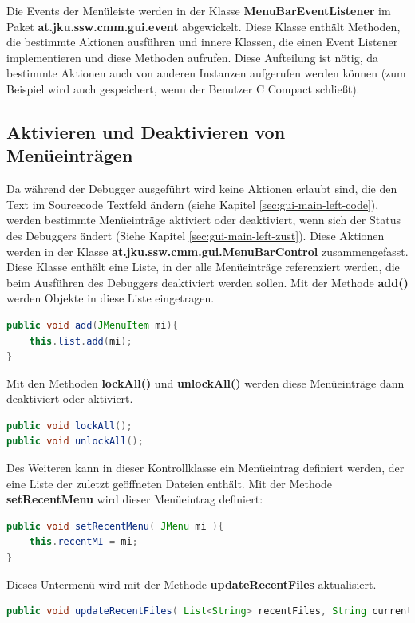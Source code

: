 Die Events der Menüleiste werden in der Klasse \textbf{MenuBarEventListener} im Paket \textbf{at.jku.ssw.cmm.gui.event} abgewickelt. Diese Klasse enthält Methoden, die bestimmte Aktionen ausführen und innere Klassen, die einen Event Listener implementieren und diese Methoden aufrufen. Diese Aufteilung ist nötig, da bestimmte Aktionen auch von anderen Instanzen aufgerufen werden können (zum Beispiel wird auch gespeichert, wenn der Benutzer C Compact schließt).

\subsection{Aktivieren und Deaktivieren von Menüeinträgen}
\label{sec:gui-main-menu-ctrl}
Da während der Debugger ausgeführt wird keine Aktionen erlaubt sind, die den Text im Sourcecode Textfeld ändern (siehe Kapitel \ref{sec:gui-main-left-code}), werden bestimmte Menüeinträge aktiviert oder deaktiviert, wenn sich der Status des Debuggers ändert (Siehe Kapitel \ref{sec:gui-main-left-zust}). Diese Aktionen werden in der Klasse \textbf{at.jku.ssw.cmm.gui.MenuBarControl} zusammengefasst. Diese Klasse enthält eine Liste, in der alle Menüeinträge referenziert werden, die beim Ausführen des Debuggers deaktiviert werden sollen. Mit der Methode \textbf{add()} werden Objekte in diese Liste eingetragen.
\begin{lstlisting}[language=JAVA]
public void add(JMenuItem mi){
	this.list.add(mi);
}
\end{lstlisting}

Mit den Methoden \textbf{lockAll()} und \textbf{unlockAll()} werden diese Menüeinträge dann deaktiviert oder aktiviert.

\begin{lstlisting}[language=JAVA]
public void lockAll();
public void unlockAll();
\end{lstlisting}

Des Weiteren kann in dieser Kontrollklasse ein Menüeintrag definiert werden, der eine Liste der zuletzt geöffneten Dateien enthält. Mit der Methode \textbf{setRecentMenu} wird dieser Menüeintrag definiert:
\begin{lstlisting}[language=JAVA]
public void setRecentMenu( JMenu mi ){
	this.recentMI = mi;
}
\end{lstlisting}

Dieses Untermenü wird mit der Methode \textbf{updateRecentFiles} aktualisiert.
\begin{lstlisting}[language=JAVA]
public void updateRecentFiles( List<String> recentFiles, String currentFile );
\end{lstlisting}


